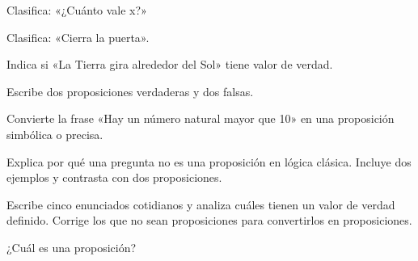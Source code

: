 \begin{activity}[id=dia-01-corta-02,type=short,weight=1]

Clasifica: «¿Cuánto vale x?»

\end{activity}

\begin{activity}[id=dia-01-corta-03,type=short,weight=1]

Clasifica: «Cierra la puerta».

\end{activity}

\begin{activity}[id=dia-01-corta-04,type=short,weight=1]

Indica si «La Tierra gira alrededor del Sol» tiene valor de verdad.

\end{activity}

\begin{activity}[id=dia-01-corta-05,type=short,weight=1]

Escribe dos proposiciones verdaderas y dos falsas.

\end{activity}

\begin{activity}[id=dia-01-corta-06,type=short,weight=1]

Convierte la frase «Hay un número natural mayor que 10» en una proposición simbólica o precisa.

\end{activity}

\begin{activity}[id=dia-01-desarrollo-01,type=long,weight=2]

Explica por qué una pregunta no es una proposición en lógica clásica. Incluye dos ejemplos y contrasta con dos proposiciones.

\end{activity}

\begin{activity}[id=dia-01-desarrollo-02,type=long,weight=2]

Escribe cinco enunciados cotidianos y analiza cuáles tienen un valor de verdad definido. Corrige los que no sean proposiciones para convertirlos en proposiciones.

\end{activity}

\begin{activity}[id=dia-01-opcion-01,type=choice,weight=1]

¿Cuál es una proposición?





\end{activity}

